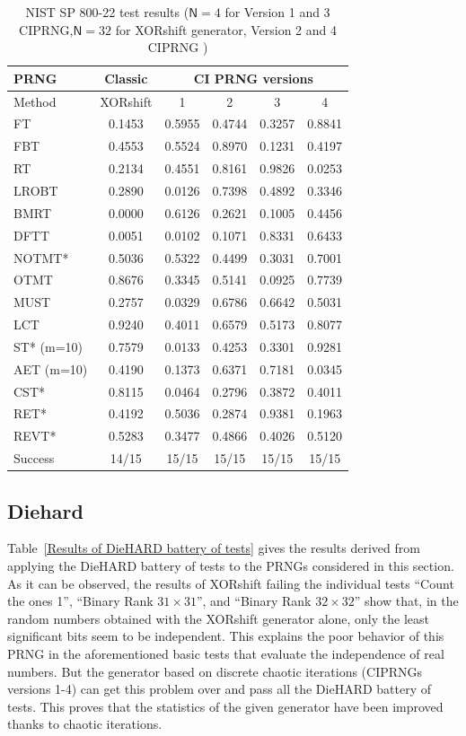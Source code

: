 \begin{table}
\renewcommand{\arraystretch}{1.3}
\caption{NIST SP 800-22 test results ($\mathsf{N}=4$ for Version 1 and 3 CIPRNG,$\mathsf{N}=32$ for XORshift generator, Version 2 and 4 CIPRNG )}
\label{The passing}
\centering
\begin{tabular}{|l||c|c|c|c|c|}
\hline
PRNG & Classic & \multicolumn{4}{c|}{CI PRNG versions}\\ \hline\hline
Method &XORshift& 1 & 2 & 3 &  4\\ \hline

FT			&0.1453&0.5955&0.4744&0.3257 & 0.8841 \\ \hline
FBT			&0.4553&0.5524&0.8970 & 0.1231 &0.4197\\ \hline
RT					&0.2134&0.4551&0.8161&0.9826&0.0253 \\ \hline
LROBT 		&0.2890&0.0126&0.7398&0.4892&0.3346 \\ \hline
BMRT 			&0.0000&0.6126&0.2621&0.1005&0.4456\\ \hline
DFTT	&0.0051&0.0102&0.1071 &0.8331 &0.6433\\ \hline
NOTMT* 	&0.5036&0.5322&0.4499 & 0.3031 & 0.7001 \\ \hline
OTMT 		&0.8676&0.3345&0.5141& 0.0925 &0.7739\\ \hline
MUST			&0.2757&0.0329&0.6786&0.6642&0.5031\\ \hline
LCT		&0.9240&0.4011&0.6579&0.5173&0.8077\\ \hline
ST* (m=10) 				&0.7579&0.0133&0.4253&0.3301&0.9281\\ \hline
AET (m=10) 		&0.4190&0.1373&0.6371&0.7181&0.0345\\ \hline
CST* 			&0.8115&0.0464&0.2796&0.3872&0.4011\\ \hline
RET* 			&0.4192&0.5036&0.2874 &0.9381 &0.1963\\ \hline
REVT* 		&0.5283&0.3477&0.4866& 0.4026 &0.5120\\ \hline
Success 					& 14/15	& 15/15& 15/15&15/15 &15/15 \\ \hline

\end{tabular}
\end{table}

\subsection{Diehard}
\label{Subsec:DieHARD}

Table~\ref{Results of DieHARD battery of tests} gives the results derived from applying the DieHARD battery of tests to the PRNGs considered in this section. As it can be observed, the results of XORshift failing the individual tests ``Count the ones 1'', ``Binary Rank $31 \times 31$'', and ``Binary Rank $32 \times 32$'' show that, in the random numbers obtained with the XORshift generator alone, only the least significant bits seem to be independent. This explains the poor behavior of this PRNG in the aforementioned basic tests that evaluate the independence of real numbers. But the generator based on discrete chaotic iterations (CIPRNGs versions 1-4) can get this problem over and pass all the DieHARD battery of tests. 
This proves that the
statistics of the given generator have been improved thanks to chaotic iterations.

